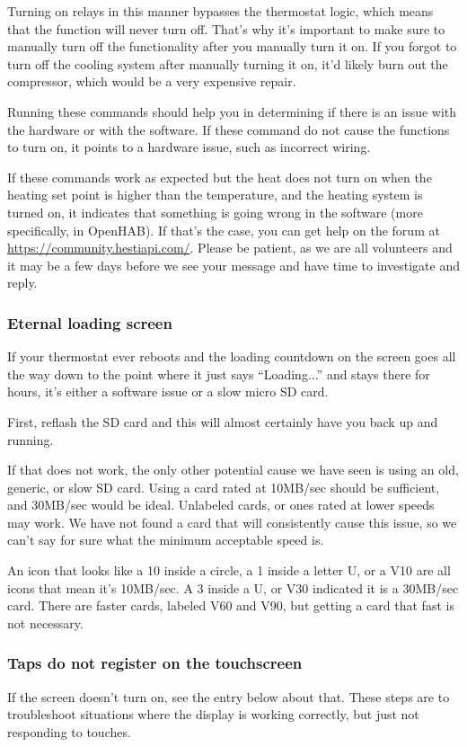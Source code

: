 Turning on relays in this manner bypasses the thermostat logic, which means
that the function will never turn off. That's why it's important to make sure
to manually turn off the functionality after you manually turn it on. If you
forgot to turn off the cooling system after manually turning it on, it'd likely
burn out the compressor, which would be a very expensive repair.

Running these commands should help you in determining if there is an issue with
the hardware or with the software. If these command do not cause the functions
to turn on, it points to a hardware issue, such as incorrect wiring.

If these commands work as expected but the heat does not turn on when the
heating set point is higher than the temperature, and the heating system is
turned on, it indicates that something is going wrong in the software (more
specifically, in OpenHAB). If that's the case, you can get help on the forum
at \url{https://community.hestiapi.com/}. Please be patient, as we are all
volunteers and it may be a few days before we see your message and have time to
investigate and reply.

\subsubsection{Eternal loading screen}
If your thermostat ever reboots and the loading countdown on the screen goes
all the way down to the point where it just says ``Loading...'' and stays there
for hours, it's either a software issue or a slow micro SD card.

First, reflash the SD card and this will almost certainly have you back up and
running.

If that does not work, the only other potential cause we have seen is using an
old, generic, or slow SD card. Using a card rated at 10MB/sec should be
sufficient, and 30MB/sec would be ideal. Unlabeled cards, or ones rated at
lower speeds may work. We have not found a card that will consistently cause
this issue, so we can't say for sure what the minimum acceptable speed is.

An icon that looks like a 10 inside a circle, a 1 inside a letter U, or a V10
are all icons that mean it's 10MB/sec. A 3 inside a U, or V30 indicated it is
a 30MB/sec card. There are faster cards, labeled V60 and V90, but getting a
card that fast is not necessary.

\subsubsection{Taps do not register on the touchscreen}
If the screen doesn't turn on, see the entry below about that. These steps are
to troubleshoot situations where the display is working correctly, but just not
responding to touches.

